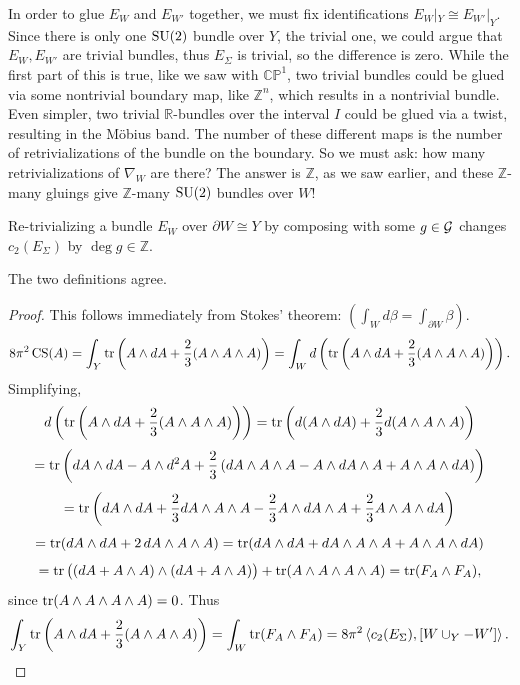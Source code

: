 \documentclass[main]{subfiles}
\begin{document}
In order to glue $E_W$ and $E_{W'}$ together, we must fix identifications $E_W|_Y \cong E_{W'}|_Y$. Since there is only one $\operatorname{SU}(2)$ bundle over $Y$, the trivial one, we could argue that $E_W, E_{W'}$ are trivial bundles, thus $E_\Sigma$ is trivial, so the difference is zero. While the first part of this is true, like we saw with $\mathbb{CP}^1$, two trivial bundles could be glued via some nontrivial boundary map, like $\mathbb{Z}^n$, which results in a nontrivial bundle. Even simpler, two trivial $\mathbb{R}$-bundles over the interval $I$ could be glued via a twist, resulting in the M\"obius band. The number of these different maps is the number of retrivializations of the bundle on the boundary. So we must ask: how many retrivializations of $\nabla_W$ are there? The answer is $\mathbb{Z}$, as we saw earlier, and these $\mathbb{Z}$-many gluings give $\mathbb{Z}$-many $\operatorname{SU}(2)$ bundles over $W$!

\begin{proposition}
Re-trivializing a bundle $E_W$ over $\partial W\cong Y$ by composing with some $g\in\mathcal{G}$ changes $c_2(E_\Sigma)$ by $\deg g \in \mathbb{Z}$.
\end{proposition}

\begin{lemma}
The two definitions agree.
\end{lemma}

\begin{proof}
This follows immediately from Stokes' theorem: $\left(\displaystyle\int_W d\beta = \int_{\partial W}\beta\right)$.
\[
8\pi^2 \operatorname{CS}(A) = \int_Y \operatorname{tr}\left(A\wedge dA + \frac{2}{3}(A\wedge A\wedge A)\right) = \int_W d\left(\operatorname{tr}\left(A\wedge dA + \frac{2}{3}(A\wedge A \wedge A)\right)\right).
\]
Simplifying,
\[
d\left(\operatorname{tr}\left(A\wedge dA + \frac{2}{3}(A\wedge A\wedge A)\right)\right) = \operatorname{tr}\left(d(A\wedge dA) + \frac{2}{3}d(A\wedge A\wedge A)\right)
\]
\[
= \operatorname{tr}\left(dA\wedge dA - A\wedge d^2 A + \frac{2}{3}\left(dA\wedge A\wedge A - A\wedge dA\wedge A + A\wedge A\wedge dA\right)\right)
\]
\[
= \operatorname{tr}\left(dA\wedge dA + \frac{2}{3}dA\wedge A\wedge A - \frac{2}{3}A\wedge dA\wedge A + \frac{2}{3}A\wedge A\wedge dA\right)
\]
\[
= \operatorname{tr}(dA\wedge dA + 2\, dA\wedge A\wedge A) = \operatorname{tr}(dA\wedge dA + dA\wedge A\wedge A + A\wedge A\wedge dA)
\]
\[
= \operatorname{tr}\big((dA+A\wedge A)\wedge(dA+A\wedge A)\big) + \operatorname{tr}(A\wedge A\wedge A\wedge A) = \operatorname{tr}(F_A\wedge F_A),
\]
since $\operatorname{tr}(A\wedge A\wedge A\wedge A) = 0$. Thus
\[
\int_Y \operatorname{tr}\left(A\wedge dA + \frac{2}{3}(A\wedge A\wedge A)\right) = \int_W \operatorname{tr}(F_A\wedge F_A) = 8\pi^2\left\langle c_2(E_\Sigma), [W\cup_Y -W']\right\rangle. \qedhere
\]
\end{proof}
\end{document}

